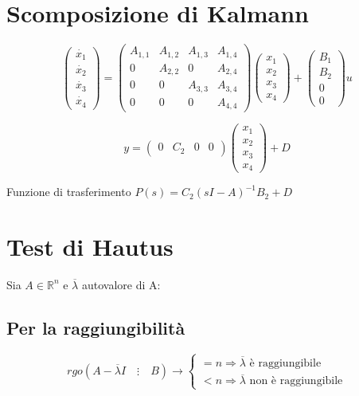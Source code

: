 \documentclass{report}
\theoremstyle{nostyle}
\begin{document}
\section{Scomposizione di Kalmann}
\[          
    \begin{pmatrix}
        \dot{x_1} \\ \dot{x_2} \\ \dot{x_3} \\ \dot{x_4}
    \end{pmatrix}
    =
    \begin{pmatrix}
        A_{1,1} & A_{1,2} & A_{1,3} & A_{1,4} \\
        0 & A_{2,2} & 0  & A_{2, 4} \\
        0 & 0 & A_{3,3} & A_{3,4} \\
        0 & 0 & 0 & A_{4,4}
    \end{pmatrix}
    \begin{pmatrix}
        x_1 \\ x_2 \\ x_3 \\ x_4
    \end{pmatrix}
    +
    \begin{pmatrix}
        B_1 \\ B_2 \\ 0 \\ 0 
    \end{pmatrix}
    u
\]

\[
y = \begin{pmatrix}
    0 & C_2 & 0 & 0
\end{pmatrix}
\begin{pmatrix}
    x_1 \\ x_2 \\ x_3 \\ x_4
\end{pmatrix}
+ 
D
\]

\begin{center}
    Funzione di trasferimento $P(s) = C_2 (sI-A)^{-1} B_2 +D$
\end{center}


\section{Test di Hautus}
Sia $A \in \mathbb{R}^n$ e $\overline{\lambda}$ autovalore di A:
\subsection*{Per la raggiungibilità}
\[
rgo(A-\overline{\lambda}I\quad \vdots \quad B) 
\rightarrow 
\begin{cases}
= n \Rightarrow \overline{\lambda} \text{ è raggiungibile}\\
< n \Rightarrow \overline{\lambda} \text{ non è raggiungibile}
\end{cases}
\]
\end{document}
